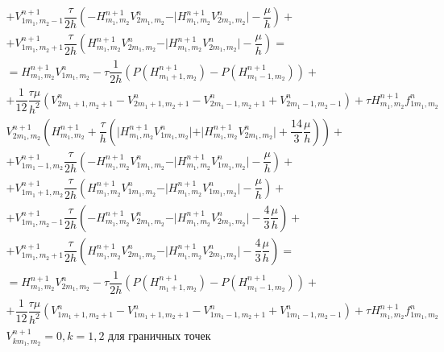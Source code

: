 \documentclass[12pt,a4paper]{article}
\begin{document}
\begin{gather*}
    + V_{1 m_1, m_2 - 1}^{n + 1} \dfrac{\tau}{2h} \left(-H_{m_1, m_2}^{n+1}V_{2 m_1, m_2}^{n} - \vert H_{m_1, m_2}^{n+1}V_{2 m_1, m_2}^{n}\vert - \dfrac{\mu}{h}\right) +\\
    + V_{1 m_1, m_2 + 1}^{n + 1} \dfrac{\tau}{2h} \left(H_{m_1, m_2}^{n+1}V_{2 m_1, m_2}^{n} - \vert H_{m_1, m_2}^{n+1}V_{2 m_1, m_2}^{n}\vert - \dfrac{\mu}{h}\right) =\\
    = H_{m_1, m_2}^{n+1}V_{1 m_1, m_2}^{n} - \tau \dfrac{1}{2h}(P(H_{m_1 + 1, m_2}^{n+1}) - P(H_{m_1 - 1, m_2}^{n+1})) +\\
    +\dfrac{1}{12} \dfrac{\tau\mu}{h^2} ( V_{2 m_1 + 1, m_2 + 1}^{n} - V_{2 m_1 + 1, m_2 + 1}^{n} - V_{2 m_1 - 1, m_2 + 1}^{n} + V_{2 m_1 - 1, m_2 - 1}^{n} ) + \tau H_{m_1, m_2}^{n+1}f_{1 m_1, m_2}^{n}\\
    V_{2 m_1, m_2}^{n+1} \left(H_{m_1, m_2}^{n+1} + \dfrac{\tau}{h} \left( \vert H_{m_1, m_2}^{n+1} V_{1 m_1, m_2}^{n} \vert  + \vert H_{m_1, m_2}^{n+1} V_{2 m_1, m_2}^{n} \vert + \dfrac{14}{3} \dfrac{\mu}{h} \right) \right) +\\
    + V_{1 m_1 - 1, m_2}^{n + 1} \dfrac{\tau}{2h} \left(-H_{m_1, m_2}^{n+1}V_{1 m_1, m_2}^{n} - \vert H_{m_1, m_2}^{n+1}V_{1 m_1, m_2}^{n}\vert - \dfrac{\mu}{h}\right) +\\
    + V_{1 m_1 + 1, m_2}^{n + 1} \dfrac{\tau}{2h} \left(H_{m_1, m_2}^{n+1}V_{1 m_1, m_2}^{n} - \vert H_{m_1, m_2}^{n+1}V_{1 m_1, m_2}^{n}\vert - \dfrac{\mu}{h}\right) +\\
    + V_{1 m_1, m_2 - 1}^{n + 1} \dfrac{\tau}{2h} \left(-H_{m_1, m_2}^{n+1}V_{2 m_1, m_2}^{n} - \vert H_{m_1, m_2}^{n+1}V_{2 m_1, m_2}^{n}\vert - \dfrac43 \dfrac{\mu}{h}\right) +\\
    + V_{1 m_1, m_2 + 1}^{n + 1} \dfrac{\tau}{2h} \left(H_{m_1, m_2}^{n+1}V_{2 m_1, m_2}^{n} - \vert H_{m_1, m_2}^{n+1}V_{2 m_1, m_2}^{n}\vert - \dfrac43 \dfrac{\mu}{h}\right) =\\
    = H_{m_1, m_2}^{n+1}V_{2 m_1, m_2}^{n} - \tau \dfrac{1}{2h}(P(H_{m_1 + 1, m_2}^{n+1}) - P(H_{m_1 - 1, m_2}^{n+1})) +\\
    +\dfrac{1}{12} \dfrac{\tau\mu}{h^2} ( V_{1 m_1 + 1, m_2 + 1}^{n} - V_{1 m_1 + 1, m_2 + 1}^{n} - V_{1 m_1 - 1, m_2 + 1}^{n} + V_{1 m_1 - 1, m_2 - 1}^{n} ) + \tau H_{m_1, m_2}^{n+1}f_{1 m_1, m_2}^{n}\\
    V_{km_1, m_2}^{n+1} = 0, k = 1,2 \text{ для граничных точек}
\end{gather*}



%
%
%
%
%
\end{document}

